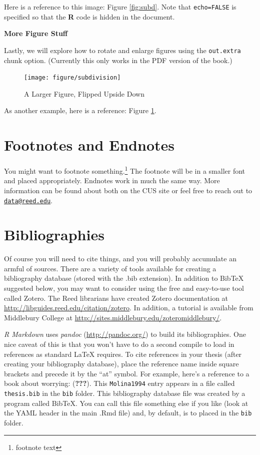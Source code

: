 \documentclass[12pt,twoside]{reedthesis}
\theoremstyle{definition}
\theoremstyle{definition}
\theoremstyle{remark}
\begin{document}
  Here is a reference to this image: Figure \ref{fig:subd}. Note that
  \texttt{echo=FALSE} is specified so that the \textbf{R} code is hidden
  in the document.
  
  \textbf{More Figure Stuff}
  
  Lastly, we will explore how to rotate and enlarge figures using the
  \texttt{out.extra} chunk option. (Currently this only works in the PDF
  version of the book.)
  
  \begin{figure}
  \texttt{[image: figure/subdivision]} \caption{A Larger Figure, Flipped Upside Down}\label{fig:subd2}
  \end{figure}
  
  As another example, here is a reference: Figure \ref{fig:subd2}.
  
  \section{Footnotes and Endnotes}\label{footnotes-and-endnotes}
  
  You might want to footnote something.\footnote{footnote text} The
  footnote will be in a smaller font and placed appropriately. Endnotes
  work in much the same way. More information can be found about both on
  the CUS site or feel free to reach out to
  \href{mailto:data@reed.edu}{\nolinkurl{data@reed.edu}}.
  
  \section{Bibliographies}\label{bibliographies}
  
  Of course you will need to cite things, and you will probably accumulate
  an armful of sources. There are a variety of tools available for
  creating a bibliography database (stored with the .bib extension). In
  addition to BibTeX suggested below, you may want to consider using the
  free and easy-to-use tool called Zotero. The Reed librarians have
  created Zotero documentation at
  \url{http://libguides.reed.edu/citation/zotero}. In addition, a tutorial
  is available from Middlebury College at
  \url{http://sites.middlebury.edu/zoteromiddlebury/}.
  
  \emph{R Markdown} uses \emph{pandoc} (\url{http://pandoc.org/}) to build
  its bibliographies. One nice caveat of this is that you won't have to do
  a second compile to load in references as standard LaTeX requires. To
  cite references in your thesis (after creating your bibliography
  database), place the reference name inside square brackets and precede
  it by the ``at'' symbol. For example, here's a reference to a book about
  worrying: ({\textbf{???}}). This \texttt{Molina1994} entry appears in a
  file called \texttt{thesis.bib} in the \texttt{bib} folder. This
  bibliography database file was created by a program called BibTeX. You
  can call this file something else if you like (look at the YAML header
  in the main .Rmd file) and, by default, is to placed in the \texttt{bib}
  folder.
  
\end{document}
